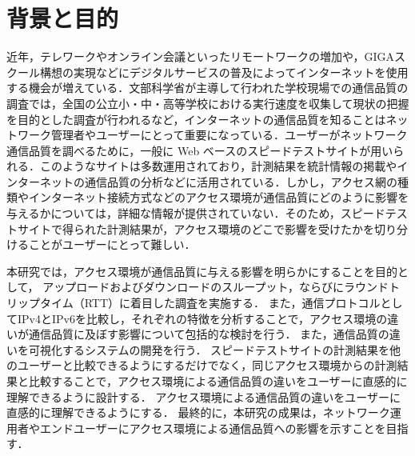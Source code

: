 \documentclass[12pt]{mthesis_utf8}
\begin{document}
\section{背景と目的}
近年，テレワークやオンライン会議といったリモートワークの増加\cite{telwork}や，GIGAスクール構想の実現などにデジタルサービスの普及によってインターネットを使用する機会が増えている．文部科学省が主導して行われた学校現場での通信品質の調査\cite{giga}では，全国の公立小・中・高等学校における実行速度を収集して現状の把握を目的とした調査が行われるなど，インターネットの通信品質を知ることはネットワーク管理者やユーザーにとって重要になっている．ユーザーがネットワーク通信品質を調べるために，一般に Web ベースのスピードテストサイトが用いられる．このようなサイトは多数運用されており，計測結果を統計情報の掲載やインターネットの通信品質の分析などに活用されている．しかし，アクセス網の種類やインターネット接続方式などのアクセス環境が通信品質にどのように影響を与えるかについては，詳細な情報が提供されていない．そのため，スピードテストサイトで得られた計測結果が，アクセス環境のどこで影響を受けたかを切り分けることがユーザーにとって難しい．

本研究では，アクセス環境が通信品質に与える影響を明らかにすることを目的として，
アップロードおよびダウンロードのスループット，ならびにラウンドトリップタイム（RTT）に着目した調査を実施する．
また，通信プロトコルとしてIPv4とIPv6を比較し，それぞれの特徴を分析することで，アクセス環境の違いが通信品質に及ぼす影響について包括的な検討を行う．
また，通信品質の違いを可視化するシステムの開発を行う．
スピードテストサイトの計測結果を他のユーザーと比較できるようにするだけでなく，同じアクセス環境からの計測結果と比較することで，アクセス環境による通信品質の違いをユーザーに直感的に理解できるように設計する．
アクセス環境による通信品質の違いをユーザーに直感的に理解できるようにする．
最終的に，本研究の成果は，ネットワーク運用者やエンドユーザーにアクセス環境による通信品質への影響を示すことを目指す．

\end{document}
